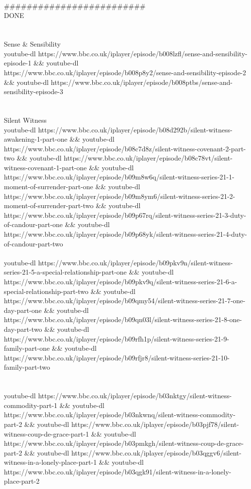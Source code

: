 \documentclass[10pt,a4paper]{article}
\begin{document}
{{{{{{{{{{{{{{{{{{{{{{{{\\
\\
\\
\#\#\#\#\#\#\#\#\#\#\#\#\#\#\#\#\#\#\#\#\#\#\#\#\#\\
DONE\\
\\
\\
Sense \& Sensibility\\
youtube-dl https://www.bbc.co.uk/iplayer/episode/b008lzfl/sense-and-sensibility-episode-1 \&\& youtube-dl https://www.bbc.co.uk/iplayer/episode/b008p8y2/sense-and-sensibility-episode-2 \&\& youtube-dl https://www.bbc.co.uk/iplayer/episode/b008ptbs/sense-and-sensibility-episode-3\\
\\
\\
Silent Witness\\
youtube-dl https://www.bbc.co.uk/iplayer/episode/b08d292b/silent-witness-awakening-1-part-one \&\& youtube-dl https://www.bbc.co.uk/iplayer/episode/b08c7d8z/silent-witness-covenant-2-part-two \&\& youtube-dl https://www.bbc.co.uk/iplayer/episode/b08c78vt/silent-witness-covenant-1-part-one \&\& youtube-dl https://www.bbc.co.uk/iplayer/episode/b09m8w6q/silent-witness-series-21-1-moment-of-surrender-part-one \&\& youtube-dl https://www.bbc.co.uk/iplayer/episode/b09m8ym6/silent-witness-series-21-2-moment-of-surrender-part-two \&\& youtube-dl https://www.bbc.co.uk/iplayer/episode/b09p67rq/silent-witness-series-21-3-duty-of-candour-part-one \&\& youtube-dl https://www.bbc.co.uk/iplayer/episode/b09p68yk/silent-witness-series-21-4-duty-of-candour-part-two\\
\\
 youtube-dl https://www.bbc.co.uk/iplayer/episode/b09pkv9n/silent-witness-series-21-5-a-special-relationship-part-one \&\& youtube-dl https://www.bbc.co.uk/iplayer/episode/b09pkv9q/silent-witness-series-21-6-a-special-relationship-part-two \&\& youtube-dl https://www.bbc.co.uk/iplayer/episode/b09qmy54/silent-witness-series-21-7-one-day-part-one \&\& youtube-dl https://www.bbc.co.uk/iplayer/episode/b09qn03l/silent-witness-series-21-8-one-day-part-two \&\& youtube-dl https://www.bbc.co.uk/iplayer/episode/b09rfh1p/silent-witness-series-21-9-family-part-one \&\& youtube-dl https://www.bbc.co.uk/iplayer/episode/b09rfjr8/silent-witness-series-21-10-family-part-two \\
\\
\\
youtube-dl https://www.bbc.co.uk/iplayer/episode/b03nktgy/silent-witness-commodity-part-1 \&\& youtube-dl https://www.bbc.co.uk/iplayer/episode/b03nkwnq/silent-witness-commodity-part-2 \&\& youtube-dl https://www.bbc.co.uk/iplayer/episode/b03pjf78/silent-witness-coup-de-grace-part-1  \&\& youtube-dl https://www.bbc.co.uk/iplayer/episode/b03pmkgh/silent-witness-coup-de-grace-part-2 \&\& youtube-dl https://www.bbc.co.uk/iplayer/episode/b03qggv6/silent-witness-in-a-lonely-place-part-1 \&\& youtube-dl https://www.bbc.co.uk/iplayer/episode/b03qgk91/silent-witness-in-a-lonely-place-part-2 \\
}}}}}}}}}}}}}}}}}}}}}}}}
\end{document}
